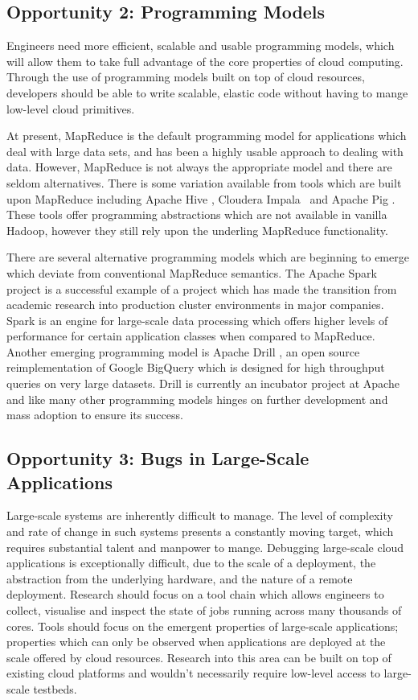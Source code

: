 \documentclass[letterpaper,twocolumn,10pt]{article}
\begin{document}
\subsection*{Opportunity 2: Programming Models}

Engineers need more efficient, scalable and usable programming models, which will allow them to take full advantage of the core properties of cloud computing. Through the use of programming models built on top of cloud resources, developers should be able to write scalable, elastic code without having to mange low-level cloud primitives. 

At present, MapReduce is the default programming model for applications which deal with large data sets, and has been a highly usable approach to dealing with data. However, MapReduce is not always the appropriate model and there are seldom alternatives. There is some variation available from tools which are built upon MapReduce including Apache Hive \cite{hive}, Cloudera Impala~\cite{impala} and Apache Pig \cite{pig}. These tools offer programming abstractions which are not available in vanilla Hadoop, however they still rely upon the underling MapReduce functionality.

There are several alternative programming models which are beginning to emerge which deviate from conventional MapReduce semantics. The Apache Spark~\cite{spark} project is a successful example of a project which has made the transition from academic research into production cluster environments in major companies. Spark is an engine for large-scale data processing which offers higher levels of performance for certain application classes when compared to MapReduce.
Another emerging programming model is Apache Drill \cite{drill}, an open source reimplementation of Google BigQuery which is designed for high throughput queries on very large datasets. Drill is currently an incubator project at Apache and like many other programming models hinges on further development and mass adoption to ensure its success. 

\subsection*{Opportunity 3: Bugs in Large-Scale Applications} 

Large-scale systems are inherently difficult to manage. The level of complexity
and rate of change in such systems presents a constantly moving target, which
requires substantial talent and manpower to mange. Debugging large-scale cloud applications is exceptionally difficult, due to
the scale of a deployment, the abstraction from the underlying hardware, and
the nature of a remote deployment. Research should focus on a tool chain which allows
engineers to collect, visualise and inspect the state of jobs running across
many thousands of cores.  Tools should focus on the emergent properties of large-scale applications; properties which can only be observed when applications are deployed at the scale offered by cloud resources. Research into this area can be built on top of existing cloud platforms and wouldn't necessarily require low-level access to large-scale testbeds. 
\end{document}
